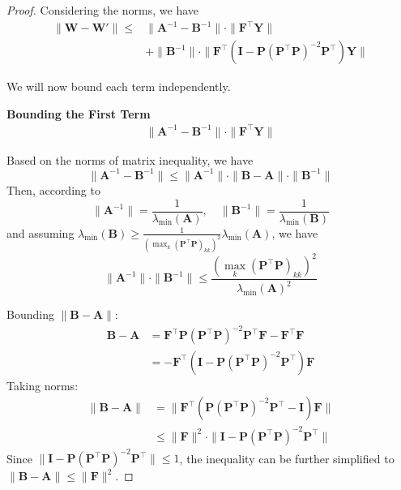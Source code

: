 \begin{proof}
Considering the norms, we have
    \begin{align*}
\| \mathbf{W} - \mathbf{W}' \| \leq &\| \mathbf{A}^{-1} - \mathbf{B}^{-1} \| \cdot \| \mathbf{F}^\top \mathbf{Y} \| \\
&+ \| \mathbf{B}^{-1} \| \cdot \| \mathbf{F}^\top (\mathbf{I} - \mathbf{P} (\mathbf{P}^\top\mathbf{P})^{-2} \mathbf{P}^\top) \mathbf{Y} \|
\end{align*}

We will now bound each term independently.

\textbf{Bounding the First Term}
\begin{align*}
        \| \mathbf{A}^{-1} - \mathbf{B}^{-1} \| \cdot \| \mathbf{F}^\top \mathbf{Y} \|
\end{align*}


Based on the norms of matrix inequality, we have
\[
\| \mathbf{A}^{-1} - \mathbf{B}^{-1} \| \leq \| \mathbf{A}^{-1} \| \cdot \| \mathbf{B} - \mathbf{A} \| \cdot \| \mathbf{B}^{-1} \|
\]
Then, according to
\[
\| \mathbf{A}^{-1} \| = \frac{1}{\lambda_{\min}(\mathbf{A})}, \quad \| \mathbf{B}^{-1} \| = \frac{1}{\lambda_{\min}(\mathbf{B})}
\]
and assuming \( \lambda_{\min}(\mathbf{B}) \geq \frac{1}{(\max_k (\mathbf{P}^\top\mathbf{P})_{kk})^2} \lambda_{\min}(\mathbf{A}) \), we have
\[
\| \mathbf{A}^{-1} \| \cdot \| \mathbf{B}^{-1} \| \leq \frac{(\max_k (\mathbf{P}^\top\mathbf{P})_{kk})^2}{\lambda_{\min}(\mathbf{A})^2}
\]

Bounding \( \| \mathbf{B} - \mathbf{A} \| \):
\begin{align*}
    \mathbf{B} - \mathbf{A} &= \mathbf{F}^\top \mathbf{P} (\mathbf{P}^\top\mathbf{P})^{-2} \mathbf{P}^\top \mathbf{F} - \mathbf{F}^\top \mathbf{F} \\
    &= -\mathbf{F}^\top (\mathbf{I} - \mathbf{P} (\mathbf{P}^\top\mathbf{P})^{-2} \mathbf{P}^\top) \mathbf{F}
\end{align*}
Taking norms:
\begin{align*}
\| \mathbf{B} - \mathbf{A} \| &= \| \mathbf{F}^\top (\mathbf{P} (\mathbf{P}^\top\mathbf{P})^{-2} \mathbf{P}^\top - \mathbf{I}) \mathbf{F} \| \\
&\leq \| \mathbf{F} \|^2 \cdot \| \mathbf{I} - \mathbf{P} (\mathbf{P}^\top\mathbf{P})^{-2} \mathbf{P}^\top \|
\end{align*}
Since \( \| \mathbf{I} - \mathbf{P} (\mathbf{P}^\top\mathbf{P})^{-2} \mathbf{P}^\top \| \leq 1 \), the inequality can be further simplified to
\(\| \mathbf{B} - \mathbf{A} \| \leq \| \mathbf{F} \|^2\).


\end{proof}
